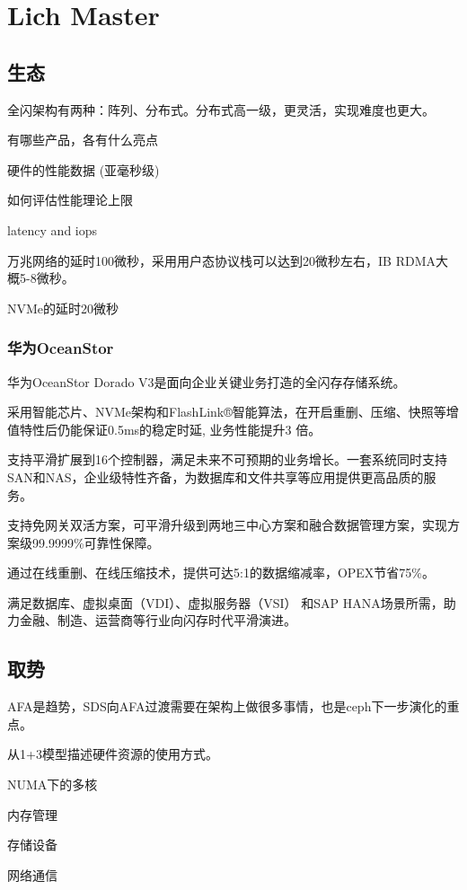 \chapter{Lich Master}

\section{生态}

全闪架构有两种：阵列、分布式。分布式高一级，更灵活，实现难度也更大。

\begin{enumbox}
\item 有哪些产品，各有什么亮点
\item 硬件的性能数据 (亚毫秒级)
\item 如何评估性能理论上限
\end{enumbox}

latency and iops

万兆网络的延时100微秒，采用用户态协议栈可以达到20微秒左右，IB RDMA大概5-8微秒。

NVMe的延时20微秒

\subsection{华为OceanStor}

华为OceanStor Dorado V3是面向企业关键业务打造的全闪存存储系统。

采用智能芯片、NVMe架构和FlashLink®智能算法，在开启重删、压缩、快照等增值特性后仍能保证0.5ms的稳定时延, 业务性能提升3 倍。

支持平滑扩展到16个控制器，满足未来不可预期的业务增长。一套系统同时支持SAN和NAS，企业级特性齐备，为数据库和文件共享等应用提供更高品质的服务。

支持免网关双活方案，可平滑升级到两地三中心方案和融合数据管理方案，实现方案级99.9999\%可靠性保障。

通过在线重删、在线压缩技术，提供可达5:1的数据缩减率，OPEX节省75\%。

满足数据库、虚拟桌面（VDI）、虚拟服务器（VSI） 和SAP HANA场景所需，助力金融、制造、运营商等行业向闪存时代平滑演进。

\section{取势}

AFA是趋势，SDS向AFA过渡需要在架构上做很多事情，也是ceph下一步演化的重点。

从1+3模型描述硬件资源的使用方式。
\begin{enumbox}
\item NUMA下的多核
\item 内存管理
\item 存储设备
\item 网络通信
\end{enumbox}

